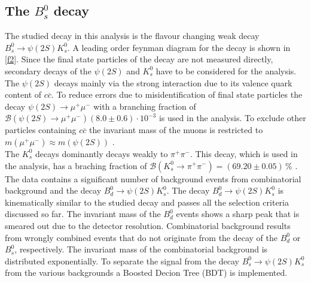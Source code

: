 \subsection{The $B_s^0$ decay}
The studied decay in this analysis is the flavour changing weak decay $B_s^0 \rightarrow \psi(2S) K_s^0$.
A leading order feynman diagram for the decay is shown in \autoref{f2}.
Since the final state particles of the decay are not measured directly, secondary decays of the $\psi(2S)$ and $K_s^0$
have to be considered for the analysis.
The $\psi(2S)$ decays mainly via the strong interaction due to its valence quark content of $c \overline{c}$.
To reduce errors due to misidentification of final state
particles the decay $\psi(2S) \rightarrow \mu^+ \mu^-$ with a branching fraction of $\mathcal{B}(\psi(2S) \rightarrow \mu^+ \mu^-)
(8.0 \pm 0.6) \cdot 10^{-3}$ \cite{pdg} is used in the analysis. To exclude other particles containing $c\overline{c}$
the invariant mass of the muons is restricted to $m(\mu^+ \mu^- ) \approx m(\psi(2S))$ .\\
The $K_s^0$ decays dominantly decays weakly to $\pi^+ \pi^-$. This decay, which is used in the analysis, has a braching fraction of
$\mathcal{B}(K_s^0 \rightarrow \pi^+ \pi^-) = (69.20 \pm 0.05) \, \%$ \cite{pdg}. \\
The data contains a significant number of background events from combinatorial background and the decay $B^0_d \rightarrow \psi(2S) K_s^0$.
The decay $B^0_d \rightarrow \psi(2S) K_s^0$ is kinematically similar to the studied decay and passes all the selection criteria discussed so far.
The invariant mass of the $B^0_d$ events shows a sharp peak that is smeared out due to the detector resolution.
Combinatorial background results from wrongly combined events that do not originate from the decay of the $B^0_d$ or $B^0_s$, respectively. The invariant mass of the
combinatorial background is distributed exponentially.
To separate the signal from the decay $B_s^0 \rightarrow \psi(2S) K_s^0$ from the various backgrounds a Boosted Decion Tree (BDT) is implemented.

